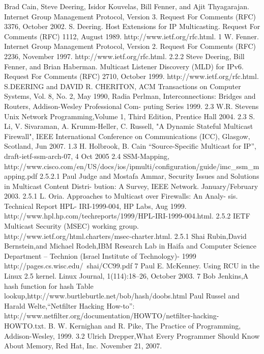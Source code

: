\begin{thebibliography}{20}
 Brad Cain, Steve Deering, Isidor Kouvelas, Bill Fenner, and Ajit Thyagarajan. Internet
Group Management Protocol, Version 3. Request For Comments (RFC) 3376, October 2002.
 S. Deering. Host Extensions for IP Multicasting. Request For Comments (RFC) 1112, August
1989. http://www.ietf.org/rfc.html. 1
 W. Fenner. Internet Group Management Protocol, Version 2. Request For Comments (RFC)
2236, November 1997. http://www.ietf.org/rfc.html. 2.2.2
 Steve Deering, Bill Fenner, and Brian Haberman. Multicast Listener Discovery (MLD) for
IPv6. Request For Comments (RFC) 2710, October 1999. http://www.ietf.org/rfc.html.
S.DEERING and DAVID R. CHERITON, ACM Transactions on Computer Systems, Vol. 8,
No. 2, May 1990,
Radia Perlman, Interconnections: Bridges and Routers, Addison-Wesley Professional Com-
puting Series 1999. 2.3
W.R. Stevens Unix Network Programming,Volume 1, Third Edition, Prentice Hall 2004. 2.3
S. Li, V. Sivaraman, A. Krumm-Heller, C. Russell, "A Dynamic Stateful Multicast Firewall",
IEEE International Conference on Communications (ICC), Glasgow, Scotland, Jun 2007. 1.3
H. Holbrook, B. Cain “Source-Specific Multicast for IP”, draft-ietf-ssm-arch-07, 4 Oct 2005 2.4
 SSM-Mapping, http://www.cisco.com/en/US/docs/ios/ipmulti/configuration/guide/imc\_ssm\_mapping.pdf
2.5.2.1
Paul Judge and Mostafa Ammar, Security Issues and Solutions in Multicast Content Distri-
bution: A Survey, IEEE Network. January/February 2003. 2.5.1
 L. Oria. Approaches to Multicast over Firewalls: An Analy- sis. Technical Report HPL-
IRI-1999-004, HP Labs, Aug 1999. http://www.hpl.hp.com/techreports/1999/HPL-IRI-1999-004.html. 2.5.2
 IETF Multicast Security (MSEC) working group. http://www.ietf.org/html.charters/msec-charter.html. 2.5.1
Shai Rubin,David Bernstein,and Michael Rodeh,IBM Research Lab in Haifa and Computer Science Department – Technion (Israel Institute of Technology)- 1999 http://pages.cs.wisc.edu/~shai/CC99.pdf 7
 Paul E. McKenney. Using RCU in the Linux 2.5 kernel. Linux Journal, 1(114):18–26, October
2003. 7
 Bob Jenkins,A hash function for hash Table lookup,http://www.burtleburtle.net/bob/hash/doobs.html
 Paul Russel
and Harald Welte,“Netfilter Hacking How-to”: http://www.netfilter.org/documentation/HOWTO/netfilter-hacking-HOWTO.txt.
 B. W. Kernighan and R. Pike, The Practice of Programming, Addison-Wesley, 1999. 3.2
 Ulrich Drepper,What Every Programmer Should Know About Memory, Red Hat, Inc. November 21, 2007.
\end{thebibliography}

